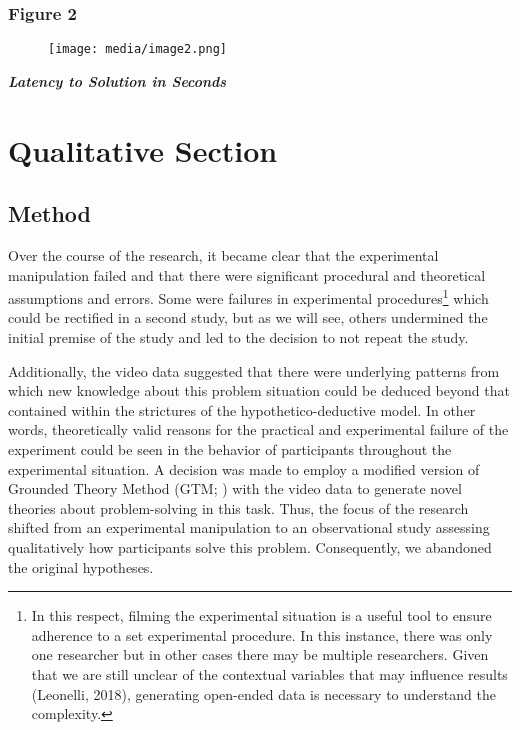 \documentclass{article}
\begin{document}
\subsubsection{}

\subsubsection{Figure 2}


\begin{figure}

  \texttt{[image: media/image2.png]}
\caption{}
\label{}


\end{figure}
\emph{\textbf{Latency to Solution in Seconds}}





\section{Qualitative Section}

\subsection{Method}

Over the course of the research, it became clear that the experimental manipulation failed and that there were significant procedural and theoretical assumptions and errors. Some were failures in experimental procedures\footnote{In this respect, filming the experimental situation is a useful tool to ensure adherence to a set experimental procedure. In this instance, there was only one researcher but in other cases there may be multiple researchers. Given that we are still unclear of the contextual variables that may influence results (Leonelli, 2018), generating open-ended data is necessary to understand the complexity. } which could be rectified in a second study, but as we will see, others undermined the initial premise of the study and led to the decision to not repeat the study. 

Additionally, the video data suggested that there were underlying patterns from which new knowledge about this problem situation could be deduced beyond that contained within the strictures of the hypothetico-deductive model. In other words, theoretically valid reasons for the practical and experimental failure of the experiment could be seen in the behavior of participants throughout the experimental situation. A decision was made to employ a modified version of Grounded Theory Method (GTM; \parencite{Glaser1967}) with the video data to generate novel theories about problem-solving in this task. Thus, the focus of the research shifted from an experimental manipulation to an observational study assessing qualitatively how participants solve this problem. Consequently, we abandoned the original hypotheses. 
\end{document}
